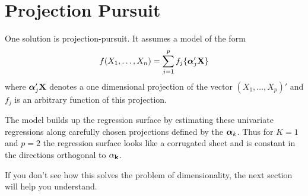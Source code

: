 \section{Projection Pursuit}
One solution is projection-pursuit. It assumes a model of the form
\[
f(X_1,\dots,X_n) = \sum_{j=1}^p f_j\{\mbox{\boldmath $\alpha$\unboldmath}_j'{\mathbf X}\}
\]
where $\mbox{\boldmath $\alpha$\unboldmath}_j ' {\mathbf X}$ denotes a one dimensional projection of the
vector $(X_1,\dots,X_p)'$ and $f_j$ is an arbitrary function of this
projection. 


The model builds up the regression surface by estimating these
univariate regressions along carefully chosen projections defined by
the $\mbox{\boldmath $\alpha$\unboldmath}_k$. Thus for $K=1$ and $p=2$ the regression surface
looks like a corrugated sheet and is constant in the directions
orthogonal to $\bf{\alpha}_k$.

If you don't see how this solves the problem of dimensionality, the
next section will help you understand.
